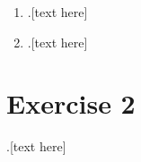 \documentclass[a4paper, 12pt]{article}
\begin{document}
\begin{enumerate}
	\item .[text here]
	
	\item .[text here]
\end{enumerate}

\section{Exercise 2}
.[text here]
\end{document}
